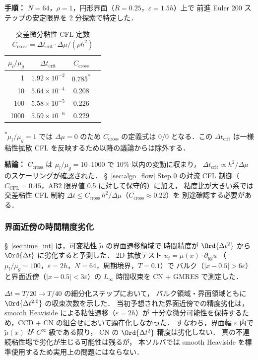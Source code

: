 \noindent\textbf{手順：}
$N = 64$，$\rho = 1$，円形界面（$R = 0.25$，$\varepsilon = 1.5h$）上で
前進 Euler 200 ステップの安定限界を 2 分探索で特定した．

\begin{table}[htbp]
\centering
\caption{交差微分粘性 CFL 定数 $C_{\mathrm{cross}} = \Delta t_{\mathrm{crit}} \cdot \Delta\mu / (\rho h^2)$}
\label{tab:cross_viscous_cfl}
\renewcommand{\arraystretch}{1.2}
\small
\begin{tabular}{rccc}
\toprule
$\mu_l / \mu_g$ & $\Delta t_{\mathrm{crit}}$ & $C_{\mathrm{cross}}$ \\
\midrule
    1 & $1.92 \times 10^{-2}$ & 0.785\textsuperscript{*} \\
   10 & $5.64 \times 10^{-4}$ & 0.208 \\
  100 & $5.58 \times 10^{-5}$ & 0.226 \\
 1000 & $5.59 \times 10^{-6}$ & 0.229 \\
\bottomrule
\end{tabular}
{\footnotesize \textsuperscript{*}$\mu_l/\mu_g = 1$ では $\Delta\mu = 0$ のため $C_{\mathrm{cross}}$ の定義式は $0/0$ となる．この $\Delta t_{\mathrm{crit}}$ は一様粘性拡散 CFL を反映するため以降の議論からは除外する．}
\end{table}

\noindent\textbf{結論：}
$C_{\mathrm{cross}}$ は $\mu_l/\mu_g = 10$--$1000$ で 10\% 以内の変動に収まり，
$\Delta t_{\mathrm{crit}} \propto h^2 / \Delta\mu$ のスケーリングが確認された．
§~\ref{sec:algo_flow} Step 0 の対流 CFL 制御（$C_{\mathrm{CFL}} = 0.45$，AB2 限界値 0.5 に対して保守的）に加え，
粘度比が大きい系では交差粘性 CFL 制約
$\Delta t \le C_{\mathrm{cross}}\,h^2/\Delta\mu$（$C_{\mathrm{cross}} \approx 0.22$）を
別途確認する必要がある．

\subsubsection{界面近傍の時間精度劣化}
\label{sec:interface_temporal_degradation}

§~\ref{sec:time_int} は，可変粘性 $\tilde\mu$ の界面遷移領域で
時間精度が $\Ord{\Delta t^2}$ から $\Ord{\Delta t}$ に劣化すると予測した．
2D 拡散テスト
$u_t = \tilde\mu(x) \cdot \partial_{yy} u$
（$\mu_l/\mu_g = 100$，$\varepsilon = 2h$，$N = 64$，周期境界，$T = 0.1$）で
バルク（$|x - 0.5| > 6\varepsilon$）と界面近傍（$|x - 0.5| < 3\varepsilon$）の
$L_\infty$ 時間収束を CN + GMRES で測定した．

$\Delta t = T/20 \to T/40$ の細分化ステップにおいて，
バルク領域・界面領域ともに $\Ord{\Delta t^{2.0}}$ の収束次数を示した．
当初予想された界面近傍での精度劣化は，
smooth Heaviside による粘性遷移（$\varepsilon = 2h$）が
十分な微分可能性を保持するため，CCD + CN の組合せにおいて顕在化しなかった．
すなわち，界面幅 $\varepsilon$ 内で $\tilde\mu(x)$ が $C^\infty$ 級である限り，
CN の $\Ord{\Delta t^2}$ 精度は劣化しない．
真の不連続粘性場で劣化が生じる可能性は残るが，
本ソルバでは smooth Heaviside を標準使用するため実用上の問題にはならない．
